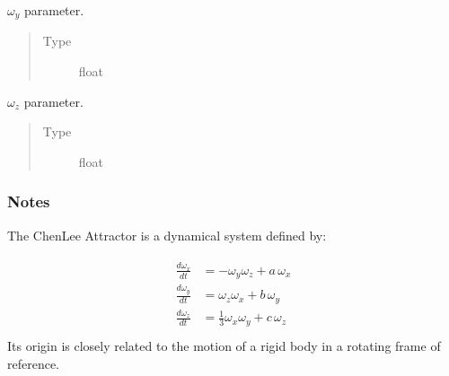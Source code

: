 \documentclass[a4paper,landscape,10pt,english]{sphinxmanual}
\begin{document}
\begin{fulllineitems}

\begin{fulllineitems}
\label{\detokenize{code_docs/simulation_api.simulation:simulation_api.simulation.simulations.ChenLeeAttractor.b}}
\(\omega_y\) parameter.
\begin{quote}\begin{description}
\item[{Type}] \leavevmode
float

\end{description}\end{quote}

\end{fulllineitems}


\begin{fulllineitems}
\label{\detokenize{code_docs/simulation_api.simulation:simulation_api.simulation.simulations.ChenLeeAttractor.c}}
\(\omega_z\) parameter.
\begin{quote}\begin{description}
\item[{Type}] \leavevmode
float

\end{description}\end{quote}

\end{fulllineitems}

\subsubsection*{Notes}

The Chen\sphinxhyphen{}Lee Attractor is a dynamical system defined by:%
\begin{footnote}[1]\sphinxAtStartFootnote
{}
%
\end{footnote}
\begin{align*}\!\begin{aligned}
\frac{d\omega_x}{dt} &= - \omega_y \omega_z + a \, \omega_x\\
\frac{d\omega_y}{dt} &= \omega_z \omega_x + b \, \omega_y\\
\frac{d\omega_z}{dt} &= \frac{1}{3} \omega_x \omega_y + c \, \omega_z\\
\end{aligned}\end{align*}
Its origin is closely related to the motion of a rigid body in a rotating
frame of reference.

\end{fulllineitems}
\end{document}
